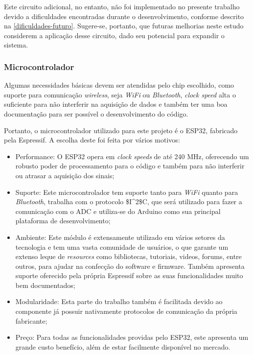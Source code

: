 Este circuito adicional, no entanto, não foi implementado no presente trabalho devido a dificuldades encontradas durante o desenvolvimento, conforme descrito na \autoref{dificuldades-futuro}. Sugere-se, portanto, que futuras melhorias neste estudo considerem a aplicação desse circuito, dado seu potencial para expandir o sistema.

\subsubsection{Microcontrolador}\label{uC-metodologia}

Algumas necessidades básicas devem ser atendidas pelo chip escolhido, como suporte para comunicação \textit{wireless}, seja \textit{WiFi} ou \textit{Bluetooth}, \textit{clock speed} alta o suficiente para não interferir na aquisição de dados e também ter uma boa documentação para ser possível o desenvolvimento do código.

Portanto, o microcontrolador utilizado para este projeto é o ESP32, fabricado pela Espressif. A escolha deste foi feita por vários motivos:

\begin{itemize}
    \item Performance: O ESP32 opera em \textit{clock speeds} de até 240 MHz, oferecendo um robusto poder de processamento para o código e também para não interferir ou atrasar a aquisição dos sinais;
    \item Suporte: Este microcontrolador tem suporte tanto para \textit{WiFi} quanto para \textit{Bluetooth}, trabalha com o protocolo \gls{$I^2$C}, que será utilizado para fazer a comunicação com o \gls{ADC} e utiliza-se do Arduino como sua principal plataforma de desenvolvimento;
    \item Ambiente: Este módulo é extensamente utilizado em vários setores da tecnologia e tem uma vasta comunidade de usuários, o que garante um extenso leque de \textit{resources} como bibliotecas, tutoriais, videos, forums, entre outros, para ajudar na confecção do software e firmware. Também apresenta suporte oferecido pela própria Espressif sobre as suas funcionalidades muito bem documentados;
    \item Modularidade: Esta parte do trabalho também é facilitada devido ao componente já possuir nativamente protocolos de comunicação da própria fabricante;
    \item Preço: Para todas as funcionalidades providas pelo ESP32, este apresenta um grande custo benefício, além de estar facilmente disponível no mercado.
\end{itemize}

